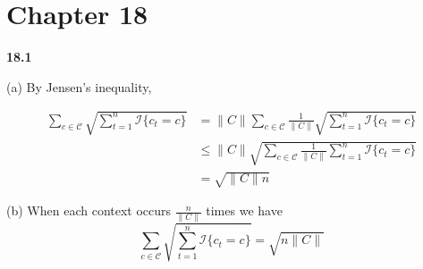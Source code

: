 \chapter*{Chapter 18}
\label{sec:18}

\noindent\textbf{18.1}


(a) By Jensen’s inequality,

\begin{align*}
    \sum_{c\in\mathcal{C}} \sqrt{\sum_{t=1}^n \mathcal{I}\{c_t = c\}} &= \|C\| \sum_{c\in\mathcal{C}} \frac{1}{\|C\|} \sqrt{\sum_{t=1}^n\mathcal{I}\{c_t = c\}}\\
    &\leq \|C\| \sqrt{\sum_{c\in\mathcal{C}} \frac{1}{\|C\|} \sum_{t=1}^n\mathcal{I}\{c_t = c\}}\\
    &= \sqrt{\|C\|n}
\end{align*}

(b)
When each context occurs $\frac{n}{\|C\|}$ times we have
\begin{equation*}
    \sum_{c\in \mathcal{C}} \sqrt{\sum_{t=1}^n \mathcal{I}\{c_t = c\}} =  \sqrt{n\|C\|}
\end{equation*}